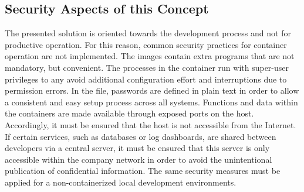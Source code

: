     \subsection{Security Aspects of this Concept}\label{ssec::sec}
    The presented solution is oriented towards the development process and not for productive operation. For this reason, common security practices for container operation are not implemented. The images contain extra programs that are not mandatory, but convenient. The processes in the container run with super-user privileges to any avoid additional configuration effort and interruptions due to permission errors. In the  file, passwords are defined in plain text in order to allow a consistent and easy setup process across all systems. Functions and data within the containers are made available through exposed ports on the host. Accordingly, it must be ensured that the host is not accessible from the Internet. If certain services, such as databases or log dashboards, are shared between developers via a central server, it must be ensured that this server is only accessible within the company network in order to avoid the unintentional publication of confidential information. The same security measures must be applied for a non-containerized local development environments.

